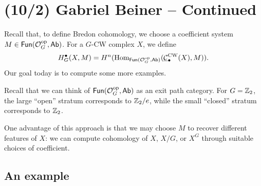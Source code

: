 \documentclass{article}
\begin{document}
\section{(10/2) Gabriel Beiner -- Continued}

Recall that, to define Bredon cohomology, we choose a coefficient system $M \in \mathsf{Fun}(\mathcal{O}_G^{\mathrm{op}}, \mathsf{Ab})$.
For a $G$-CW complex $X$, we define
\[
  H^\bullet_G(X, M) = H^n(\operatorname{Hom}_{\mathsf{Fun}(\mathcal{O}_G^{\mathrm{op}}, \mathsf{Ab})}(\underline{\mathcal{C}}_\bullet^{\mathrm{CW}}(X), M)).
\]
Our goal today is to compute some more examples.

Recall that we can think of $\mathsf{Fun}(\mathcal{O}_G^{\mathrm{op}}, \mathsf{Ab})$ as an exit path category.
For $G = \mathbb{Z}_2$, the large ``open'' stratum corresponds to $\mathbb{Z}_2 / e$, while the small ``closed'' stratum corresponds to $\mathbb{Z}_2$.

One advantage of this approach is that we may choose $M$ to recover different features of $X$: we can compute cohomology of $X$, $X / G$, or $X^G$ through suitable choices of coefficient.

\subsection{An example}
\end{document}
